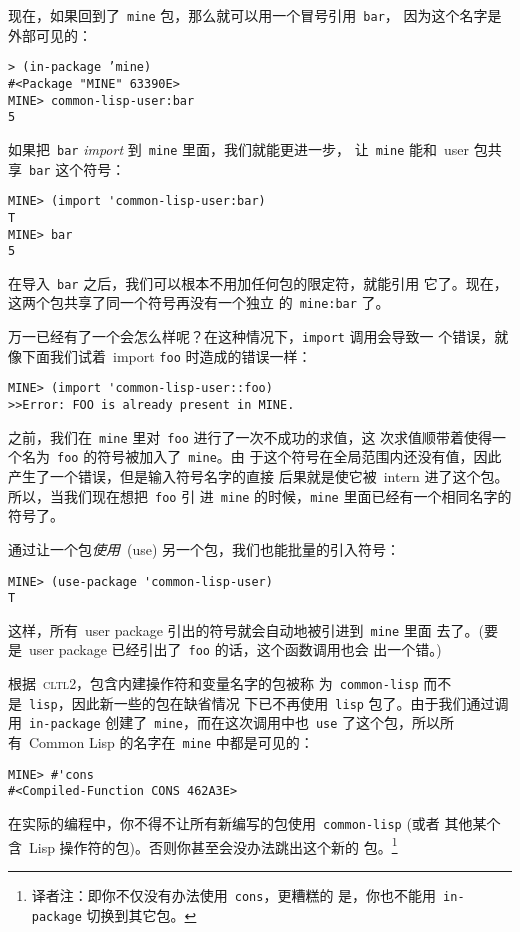 现在，如果回到了~\verb|mine| 包，那么就可以用一个冒号引用~\verb|bar|，
因为这个名字是外部可见的：
\begin{verbatim}
> (in-package ’mine)
#<Package "MINE" 63390E>
MINE> common-lisp-user:bar
5
\end{verbatim}

如果把~\texttt{bar} \emph{import} 到~\texttt{mine} 里面，我们就能更进一步，
让~\texttt{mine} 能和~user 包共享~\texttt{bar} 这个符号：
\begin{verbatim}
MINE> (import 'common-lisp-user:bar)
T
MINE> bar
5
\end{verbatim}
在导入~\texttt{bar} 之后，我们可以根本不用加任何包的限定符，就能引用
它了。现在，这两个包共享了同一个符号\pozhehao{}再没有一个独立
的~\texttt{mine:bar} 了。

万一已经有了一个会怎么样呢？在这种情况下，\texttt{import} 调用会导致一
个错误，就像下面我们试着~import \texttt{foo} 时造成的错误一样：
\begin{verbatim}
MINE> (import 'common-lisp-user::foo)
>>Error: FOO is already present in MINE.
\end{verbatim}

之前，我们在~\texttt{mine} 里对~\texttt{foo} 进行了一次不成功的求值，这
次求值顺带着使得一个名为~\texttt{foo} 的符号被加入了~\texttt{mine}。由
于这个符号在全局范围内还没有值，因此产生了一个错误，但是输入符号名字的直接
后果就是使它被~intern 进了这个包。所以，当我们现在想把~\texttt{foo} 引
进~\texttt{mine} 的时候，\texttt{mine} 里面已经有一个相同名字的符号了。

通过让一个包\emph{使用}~(use) 另一个包，我们也能批量的引入符号：
\begin{verbatim}
MINE> (use-package 'common-lisp-user)
T
\end{verbatim}
这样，所有~user package 引出的符号就会自动地被引进到~\texttt{mine} 里面
去了。(要是~user package 已经引出了~\texttt{foo} 的话，这个函数调用也会
出一个错。)

根据~\textsc{cltl}2，包含内建操作符和变量名字的包被称
为~\texttt{common-lisp} 而不是~\texttt{lisp}，因此新一些的包在缺省情况
下已不再使用~\texttt{lisp} 包了。由于我们通过调用~\texttt{in-package}
创建了~\texttt{mine}，而在这次调用中也~\texttt{use} 了这个包，所以所
有~Common Lisp 的名字在~\texttt{mine} 中都是可见的：
\begin{verbatim}
MINE> #'cons
#<Compiled-Function CONS 462A3E>
\end{verbatim}
在实际的编程中，你不得不让所有新编写的包使用~\texttt{common-lisp} (或者
其他某个含~Lisp 操作符的包)。否则你甚至会没办法跳出这个新的
包。\footnote{译者注：即你不仅没有办法使用~\texttt{cons}，更糟糕的
  是，你也不能用~\texttt{in-package} 切换到其它包。}

